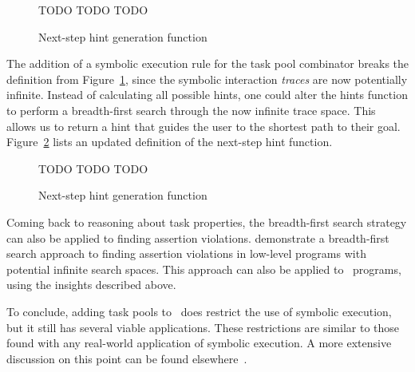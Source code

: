\begin{figure}
    TODO TODO TODO
    \caption{Next-step hint generation function}
    \label{fig:next-step-hint}
\end{figure}


The addition of a symbolic execution rule for the task pool combinator breaks the definition from Figure~\ref{fig:next-step-hint}, since the symbolic interaction \textit{traces} are now potentially infinite. 
Instead of calculating all possible hints, one could alter the hints function to perform a breadth-first search through the now infinite trace space.
This allows us to return a hint that guides the user to the shortest path to their goal.
Figure~\ref{fig:next-step-hint-pool} lists an updated definition of the next-step hint function.

\begin{figure}
    TODO TODO TODO
    \caption{Next-step hint generation function}
    \label{fig:next-step-hint-pool}
\end{figure}

Coming back to reasoning about task properties, the breadth-first search strategy can also be applied to finding assertion violations.
\citet{DBLP:conf/tap/NausVSR23} demonstrate a breadth-first search approach to finding assertion violations in low-level programs with potential infinite search spaces.
This approach can also be applied to \DYNTOPHAT\ programs, using the insights described above.

To conclude, adding task pools to \TOPHAT\ does restrict the use of symbolic execution, but it still has several viable applications.
These restrictions are similar to those found with any real-world application of symbolic execution.
A more extensive discussion on this point can be found elsewhere~\cite{conf/ifl/NausSK19}.